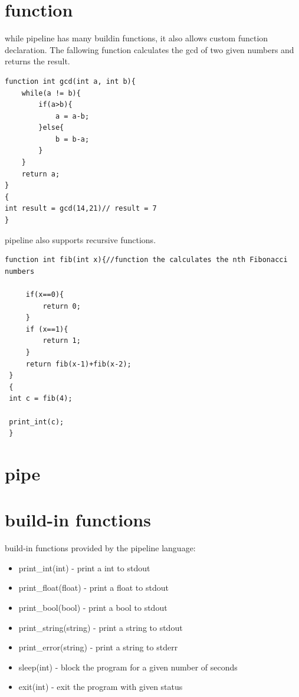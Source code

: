 \documentclass[./Report_main.tex]{subfiles}
\begin{document}
\section{function}
while pipeline has many buildin functions, it also allows custom function declaration. The fallowing function calculates the gcd of two given numbers and returns the result.\\
\begin{lstlisting}
function int gcd(int a, int b){
    while(a != b){
        if(a>b){
            a = a-b;
        }else{
            b = b-a;
        }
    }
    return a;
}
{
int result = gcd(14,21)// result = 7
}
\end{lstlisting}
pipeline also supports recursive functions.\\
\begin{lstlisting}
function int fib(int x){//function the calculates the nth Fibonacci numbers
 
     if(x==0){
         return 0;
     }
     if (x==1){
         return 1;
     }
     return fib(x-1)+fib(x-2);
 }
 {
 int c = fib(4);
 
 print_int(c);
 }
\end{lstlisting}
\section{pipe}
\section{build-in functions}
build-in functions provided by the pipeline language:\\
\begin{itemize}
    \item print\_int(int) - print a int to stdout
    \item print\_float(float) - print a float to stdout
    \item print\_bool(bool) - print a bool to stdout
    \item print\_string(string) - print a string to stdout
    \item print\_error(string) - print a string to stderr
    \item sleep(int) - block the program for a given number of seconds
    \item exit(int) - exit the program with given status
\end{itemize}
\end{document}

